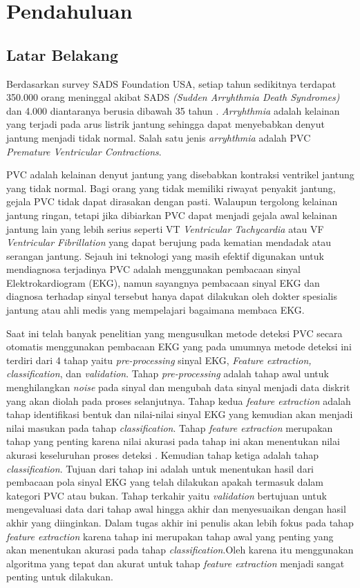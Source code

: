 \chapter{Pendahuluan}
\section{Latar Belakang}
Berdasarkan survey SADS Foundation USA, setiap tahun sedikitnya terdapat 350.000 orang meninggal akibat SADS \textit{(Sudden Arryhthmia Death Syndromes)} dan 4.000 diantaranya berusia dibawah 35 tahun \cite{sads}. \textit{Arryhthmia} adalah kelainan yang terjadi pada arus listrik jantung sehingga dapat menyebabkan denyut jantung menjadi tidak normal. Salah satu jenis \textit{arryhthmia} adalah PVC \textit{Premature Ventricular Contractions}.

PVC adalah kelainan denyut jantung yang disebabkan kontraksi ventrikel jantung yang tidak normal. Bagi orang yang tidak memiliki riwayat penyakit jantung, gejala PVC tidak dapat dirasakan dengan pasti. Walaupun tergolong kelainan jantung ringan, tetapi jika dibiarkan PVC dapat menjadi gejala awal kelainan jantung lain yang lebih serius\cite{RobertChen,Pedro2014} seperti VT \textit{Ventricular Tachycardia} atau VF \textit{Ventricular Fibrillation} yang dapat berujung pada kematian mendadak atau serangan jantung. Sejauh ini teknologi yang masih efektif digunakan untuk mendiagnosa terjadinya PVC adalah menggunakan pembacaan sinyal Elektrokardiogram (EKG)\cite{Karpagachelvi2010,RobertChen,Sreelakshmi}, namun sayangnya pembacaan sinyal EKG dan diagnosa terhadap sinyal tersebut hanya dapat dilakukan oleh dokter spesialis jantung atau ahli medis yang mempelajari bagaimana membaca EKG. 

Saat ini telah banyak penelitian yang mengusulkan metode deteksi PVC secara otomatis menggunakan pembacaan EKG yang pada umumnya metode deteksi ini terdiri dari 4 tahap yaitu \textit{pre-processing} sinyal EKG, \textit{Feature extraction, classification}, dan \textit{validation}. Tahap \textit{pre-processing} adalah tahap awal untuk menghilangkan \textit{noise} pada sinyal dan mengubah data sinyal menjadi data diskrit yang akan diolah pada proses selanjutnya. Tahap kedua \textit{feature extraction} adalah tahap identifikasi bentuk dan nilai-nilai sinyal EKG yang kemudian akan menjadi nilai masukan pada tahap \textit{classification}. Tahap \textit{feature extraction} merupakan tahap yang penting karena nilai akurasi pada tahap ini akan menentukan nilai akurasi keseluruhan proses deteksi \cite{Sreelakshmi,RobertChen}. Kemudian tahap ketiga adalah tahap \textit{classification}. Tujuan dari tahap ini adalah untuk menentukan hasil dari pembacaan pola sinyal EKG yang telah dilakukan apakah termasuk dalam kategori PVC atau bukan. Tahap terkahir yaitu \textit{validation} bertujuan untuk mengevaluasi data dari tahap awal hingga akhir dan menyesuaikan dengan hasil akhir yang diinginkan. Dalam tugas akhir ini penulis akan lebih fokus pada tahap \textit{feature extraction} karena tahap ini merupakan tahap awal yang penting yang akan menentukan akurasi pada tahap \textit{classification}.Oleh karena itu menggunakan algoritma yang tepat dan akurat untuk tahap \textit{feature extraction} menjadi sangat penting untuk dilakukan.

